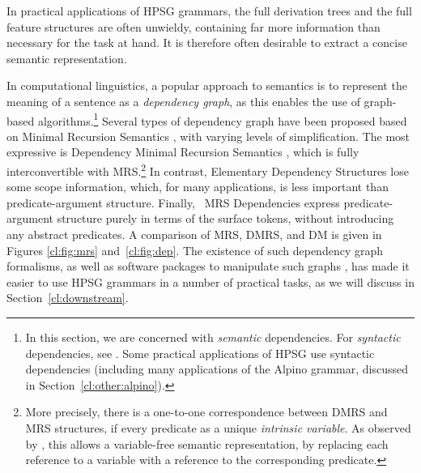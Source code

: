 \documentclass[output=paper,nonflat]{langsci/langscibook}
\begin{document}
In practical applications of HPSG grammars,
the full derivation trees and the full feature structures are often unwieldy,
containing far more information than necessary for the task at hand.
It is therefore often desirable to extract a concise semantic representation.

In computational linguistics,
a popular approach to semantics is to represent the meaning of a sentence as a \textit{dependency graph},
as this enables the use of graph-based algorithms.\footnote{%
	In this section, we are concerned with \emph{semantic} dependencies.
	For \emph{syntactic} dependencies, see .
	Some practical applications of HPSG use syntactic dependencies
	(including many applications of the Alpino grammar, discussed in Section~\ref{cl:other:alpino}).
}
Several types of dependency graph have been proposed
based on Minimal Recursion Semantics \citep[MRS;][]{CFPS2005a},
with varying levels of simplification.
The most expressive is Dependency Minimal Recursion Semantics \citep[DMRS;][]{copestake2009dmrs},
which is fully interconvertible with MRS.\footnote{%
	More precisely, there is a one-to-one correspondence between DMRS and MRS structures,
	if every predicate as a unique \textit{intrinsic variable}.
	As observed by \citet{oepen2006eds}, this allows a variable-free semantic representation,
	by replacing each reference to a variable with a reference to the corresponding predicate.
}
In contrast, Elementary Dependency Structures \citep[EDS;][]{oepen2006eds}
lose some scope information,
which, for many applications, is less important than predicate-argument structure.
Finally, \delphin\ MRS Dependencies \citep[DM;][]{ivanova2012dm}
express predicate-argument structure purely in terms of the surface tokens,
without introducing any abstract predicates.
A comparison of MRS, DMRS, and DM is given in Figures \ref{cl:fig:mrs} and~\ref{cl:fig:dep}.
The existence of such dependency graph formalisms,
as well as software packages to manipulate such graphs \citep{copestake2016pydmrs},
has made it easier to use HPSG grammars in a number of practical tasks,
as we will discuss in Section~\ref{cl:downstream}.





\end{document}
